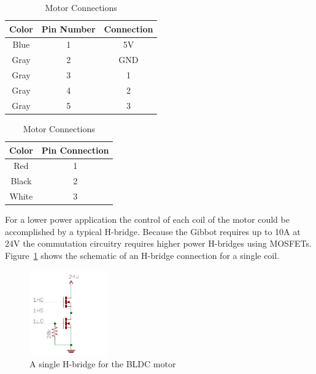 \documentclass{article}
\begin{document}
\begin{table}[h!]
	\centering
	\label{motpin1}
	\caption{Motor Connections}
	\begin{subtable}[t]{0.4\textwidth}	
		\centering
		\begin{tabular}{| c | c | c |}
			\hline
			\textbf{Color} & \textbf{Pin Number} & \textbf{Connection} \\ \hline
			Blue & 1 & 5V \\ \hline
			Gray & 2 & GND \\ \hline
			Gray & 3 & 1 \\ \hline
			Gray & 4 & 2 \\ \hline
			Gray & 5 & 3 \\ \hline
		\end{tabular}
	\end{subtable}
	\begin{subtable}[t]{0.4\textwidth}
		\centering
		\begin{tabular}{| c | c |}
			\hline
			\textbf{Color} & \textbf{Pin Connection} \\ \hline
			Red & 1  \\ \hline
			Black & 2 \\ \hline
			White & 3 \\ \hline
		\end{tabular}
	\end{subtable}
\end{table}

For a lower power application the control of each coil of the motor could be accomplished by a typical H-bridge. Because the Gibbot requires up to 10A at 24V the commutation circuitry requires higher power H-bridges using MOSFETs.  Figure~\ref{fig:hbridge} shows the schematic of an H-bridge connection for a single coil. 
\begin{figure}[h]
	\centering
	\includegraphics[width=0.3\textwidth]{hbridge}
	\caption{A single H-bridge for the BLDC motor}
	\label{fig:hbridge}
\end{figure}
\end{document}
